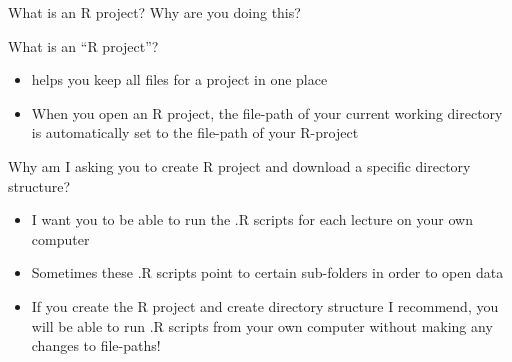 \documentclass[
  8pt,
  ignorenonframetext,
  dvipsnames]{beamer}
\providecommand{\tightlist}{%
  \setlength{\itemsep}{0pt}\setlength{\parskip}{0pt}}
\let\olditem\item
\renewcommand{\item}{%
  \olditem\vspace{4pt}
}
\begin{document}
\begin{frame}{What is an R project? Why are you doing this?}
\protect\hypertarget{what-is-an-r-project-why-are-you-doing-this}{}

What is an ``R project''?

\begin{itemize}
\tightlist
\item
  helps you keep all files for a project in one place
\item
  When you open an R project, the file-path of your current working
  directory is automatically set to the file-path of your R-project
\end{itemize}

Why am I asking you to create R project and download a specific
directory structure?

\begin{itemize}
\tightlist
\item
  I want you to be able to run the .R scripts for each lecture on your
  own computer
\item
  Sometimes these .R scripts point to certain sub-folders in order to
  open data
\item
  If you create the R project and create directory structure I
  recommend, you will be able to run .R scripts from your own computer
  without making any changes to file-paths!
\end{itemize}

\end{frame}
\end{document}
